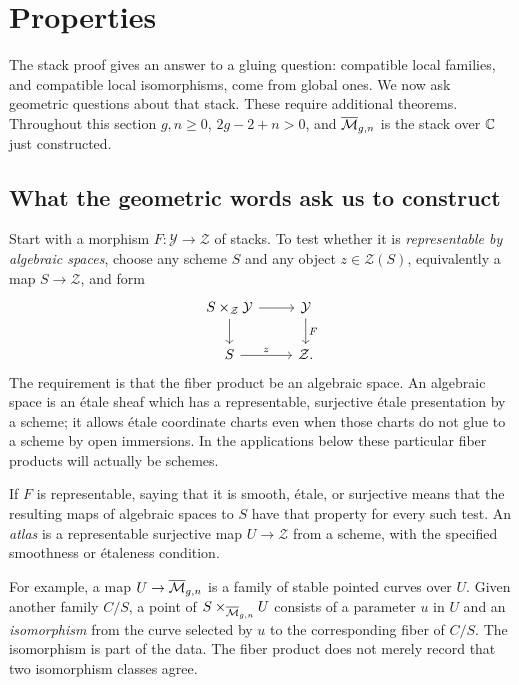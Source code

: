 \section{Properties}\label{sec:curve-properties}

The stack proof gives an answer to a gluing question: compatible local
families, and compatible local isomorphisms, come from global ones.
We now ask geometric questions about that stack. These require additional
theorems. Throughout this section $g,n\geq 0$, $2g-2+n>0$, and
$\overline{\mathcal M}_{g,n}$ is the stack over $\mathbb C$ just constructed.

\subsection{What the geometric words ask us to construct}

\begin{Def}
Start with a morphism $F:\mathcal Y\to\mathcal Z$ of stacks. To test
whether it is \emph{representable by algebraic spaces}, choose any scheme
$S$ and any object $z\in\mathcal Z(S)$, equivalently a map
$S\to\mathcal Z$, and form
\[
\begin{tikzcd}
S\times_{\mathcal Z}\mathcal Y \arrow[r]\arrow[d]
  & \mathcal Y\arrow[d,"F"]\\
S\arrow[r,"z"] & \mathcal Z.
\end{tikzcd}
\]
The requirement is that the fiber product be an algebraic space.
An algebraic space is an \'etale sheaf which has a representable,
surjective \'etale presentation
by a scheme; it allows \'etale coordinate charts even when those charts
do not glue to a scheme by open immersions. In the applications below
these particular fiber products will actually be schemes.

If $F$ is representable, saying that it is smooth, \'etale, or
surjective means that the resulting maps of algebraic spaces to $S$
have that property for every such test. An \emph{atlas} is a
representable surjective map $U\to\mathcal Z$ from a scheme, with the
specified smoothness or \'etaleness condition.
\end{Def}

For example, a map $U\to\overline{\mathcal M}_{g,n}$ is a family of stable pointed curves
over $U$. Given another family $C/S$, a point of
$S\times_{\overline{\mathcal M}_{g,n}}U$ consists of a parameter $u$ in $U$ and an
\emph{isomorphism} from the curve selected by $u$ to the corresponding
fiber of $C/S$. The isomorphism is part of the data. The fiber product
does not merely record that two isomorphism classes agree.

